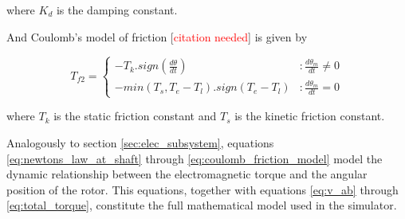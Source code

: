 \documentclass{article}
\begin{document}
    where $K_d$ is the damping constant.

    And Coulomb's model of friction [\textcolor{red}{citation needed}] is given by

    \begin{equation}
       T_{f2} = \left\{
         \begin{array}{lr}
           -T_k.sign(\frac{d\theta}{dt}) & : \frac{d\theta_m}{dt} \neq 0\\
           -min(T_s,T_e-T_l).sign(T_e-T_l) & : \frac{d\theta_m}{dt} = 0
         \end{array}
       \right.
       \label{eq:coulomb_friction_model}
    \end{equation}

    where $T_k$ is the static friction constant and $T_s$ is the kinetic friction constant.

    Analogously to section \ref{sec:elec_subsystem}, equations \ref{eq:newtons_law_at_shaft} through \ref{eq:coulomb_friction_model} model the dynamic relationship between the electromagnetic torque and the angular position of the rotor. This equations, together with equations \ref{eq:v_ab} through \ref{eq:total_torque}, constitute the full mathematical model used in the simulator.
\end{document}
